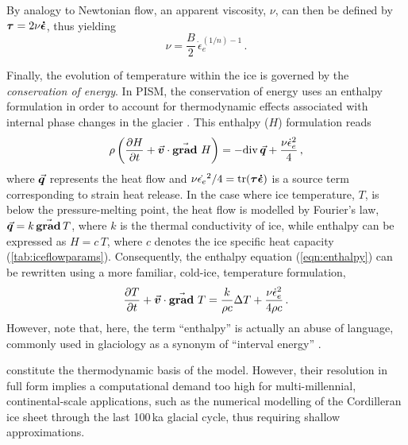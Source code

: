 \documentclass{article}
\newcommand{\vect}[1]{\va*{#1}} %
\newcommand{\tens}[1]{\vb*{#1}} %
\renewcommand{\div}[1]{\mathrm{div}\,#1}            %
\renewcommand{\grad}[1]{\vect{\mathrm{grad}}\,#1}   %
\newcommand{\matdv}[1]{\pdv{#1}{t}+\vect{v}\cdot\grad{}\,#1}  %
\newcommand{\doteps}[0]{\dot{\epsilon}} %
\newcommand{\DST}[0]{\tens{\tau}}       %
\newcommand{\SRT}[0]{\tens{\doteps}}    %
\begin{document}
By analogy to Newtonian flow, an apparent viscosity, $\nu$, can then be defined
by ${\DST = 2 \nu\SRT}$, thus yielding
\begin{equation}
    \label{eqn:viscosity}
    \nu = \frac{B}{2}\,\doteps_e^{(1/n)-1} \,.
\end{equation}

Finally, the evolution of temperature within the ice is governed by the
\emph{conservation of energy}. In PISM, the conservation of energy uses an
enthalpy formulation in order to
account for thermodynamic effects associated with internal phase changes in the
glacier \citep[Eqs.~20--21]{Aschwanden.etal.2012}. This enthalpy ($H$)
formulation reads
\begin{equation}
    \label{eqn:enthalpy}
    \rho \left(\matdv{H}\right)
        = -\div{\vect{q}} + \frac{\nu\doteps_e^2}{4} \,,
\end{equation}
where $\vect{q}$ represents the heat flow and
${\nu\dot{\epsilon_e}^2/4 = \tr(\DST\SRT)}$ is a
source term corresponding to strain heat release. In the case where ice
temperature, $T$, is below the pressure-melting point, the heat flow is
modelled by Fourier's law, $\vect{q} = k\,\grad{T}$, where $k$ is the thermal
conductivity of ice, while enthalpy can be expressed as $H=c\,T$, where $c$
denotes the ice specific heat capacity (\cref{tab:iceflowparams}).
Consequently, the enthalpy equation (\ref{eqn:enthalpy}) can be rewritten using
a more familiar, cold-ice, temperature formulation,
\begin{equation}
    \label{eqn:temperature}
    \matdv{T} = \frac{k}{\rho c} \Delta T
                + \frac{\nu\doteps_e^2}{4\rho c} \,.
\end{equation}
However, note that, here, the term ``enthalpy'' is actually an abuse of
language, commonly used in glaciology as a synonym of ``interval energy''
\citep{Aschwanden.etal.2012}.

constitute the thermodynamic basis
of the model. However, their resolution in full form implies a computational
demand too high for multi-millennial, continental-scale applications, such as
the numerical modelling of the Cordilleran ice sheet through the last 100\,ka
glacial cycle, thus requiring shallow approximations.
\end{document}
